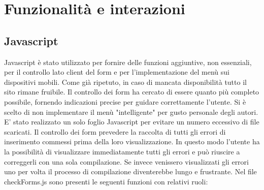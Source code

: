 \newpage
\section{Funzionalità e interazioni}
\subsection{Javascript}
Javascript è stato utilizzato per fornire delle funzioni aggiuntive, non essenziali, per il controllo lato client del form e per l'implementazione del menù sui dispositivi mobili. Come già ripetuto, in caso di mancata disponibilità tutto il sito rimane fruibile. 
Il controllo dei form ha cercato di essere quanto più completo possibile, fornendo indicazioni precise per guidare correttamente l'utente.
Si è scelto di non implementare il menù "intelligente" per gusto personale degli autori. 
E' stato realizzato un solo foglio Javascript per evitare un numero eccessivo di file scaricati. Il controllo dei form prevedere la raccolta di tutti gli errori di inserimento commessi prima della loro visualizzazione. In questo modo l'utente ha la possibilità di visualizzare immediatamente tutti gli errori e può riuscire a correggerli con una sola compilazione. Se invece venissero visualizzati gli errori uno per volta il processo di compilazione diventerebbe lungo e frustrante.
Nel file checkForms.js sono presenti le seguenti funzioni con relativi ruoli:
